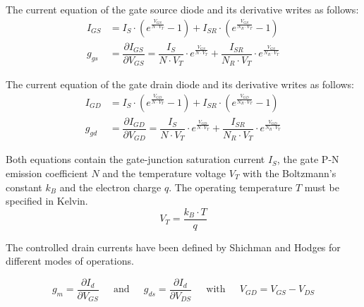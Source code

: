 \documentclass[10pt]{report}
\begin{document}
The current equation of the gate source diode and its derivative
writes as follows:
\begin{align}
I_{GS} &= I_{S}\cdot \left(e^{\frac{V_{GS}}{N\cdot V_{T}}} - 1\right) + I_{SR}\cdot \left(e^{\frac{V_{GS}}{N_{R}\cdot V_{T}}} - 1\right)\\
g_{gs} &= \dfrac{\partial I_{GS}}{\partial V_{GS}} = \dfrac{I_{S}}{N\cdot V_{T}}\cdot e^{\frac{V_{GS}}{N\cdot V_{T}}} + \dfrac{I_{SR}}{N_{R}\cdot V_{T}}\cdot e^{\frac{V_{GS}}{N_{R}\cdot V_{T}}}
\end{align}

The current equation of the gate drain diode and its derivative writes
as follows:
\begin{align}
I_{GD} &= I_{S}\cdot \left(e^{\frac{V_{GD}}{N\cdot V_{T}}} - 1\right) + I_{SR}\cdot \left(e^{\frac{V_{GD}}{N_{R}\cdot V_{T}}} - 1\right)\\
g_{gd} &= \dfrac{\partial I_{GD}}{\partial V_{GD}} = \dfrac{I_{S}}{N\cdot V_{T}}\cdot e^{\frac{V_{GD}}{N\cdot V_{T}}} + \dfrac{I_{SR}}{N_{R}\cdot V_{T}}\cdot e^{\frac{V_{GD}}{N_{R}\cdot V_{T}}}
\end{align}

Both equations contain the gate-junction saturation current $I_{S}$,
the gate P-N emission coefficient $N$ and the temperature voltage
$V_{T}$ with the Boltzmann's constant $k_{B}$ and the electron charge
$q$.  The operating temperature $T$ must be specified in Kelvin.
\begin{equation}
V_{T} = \dfrac{k_{B}\cdot T}{q}
\end{equation}

The controlled drain currents have been defined by Shichman and Hodges
\cite{Shichman} for different modes of operations.

\begin{equation}
g_{m} = \dfrac{\partial I_{d}}{\partial V_{GS}}
\;\;\;\; \text{ and } \;\;\;\;
g_{ds} = \dfrac{\partial I_{d}}{\partial V_{DS}}
\;\;\;\; \text{ with } \;\;\;\;
V_{GD} = V_{GS} - V_{DS}
\end{equation}
\end{document}
